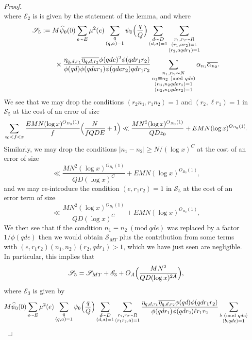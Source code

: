 \documentclass[10pt]{amsart}
\theoremstyle{plain}
\numberwithin{equation}{section}
\newcommand{\Mod}[1]{\ (\mathrm{mod}\ #1)}
\renewcommand{\hat}[1]{\widehat #1}
\begin{document}
\begin{proof}
\begin{equation}
\end{equation}
where $\mathscr{E}_2$ is is given by the statement of the lemma, and where
\begin{align*}
\mathscr{S}_5&:=M\hat{\psi}_0(0)\sum_{e\sim E}\mu^2(e)\sum_{\substack{q\\ (q,a)=1}}\psi_0\Bigl(\frac{q}{Q}\Bigr)\sum_{\substack{d\sim D\\ (d,a)=1}}\sum_{\substack{r_1,r_2\sim R\\ (r_1,a r_2)=1\\ (r_2,a q d r_1)=1}}\\
&\qquad\times\frac{\eta_{q,d,r_1}\overline{\eta_{q,d,r_2}} \phi(q d e)^2\phi(q d r_1 r_2)}{\phi(q d)\phi(q d e r_1)\phi(q d e r_2)q d r_1 r_2}\sum_{\substack{n_1,n_2\sim N\\ n_1\equiv n_2\Mod{q d e}\\ (n_1,n_2 q d e r_1)=1\\(n_2,n_1 q d e r_2)=1}}\alpha_{n_1}\overline{\alpha_{n_2}}.
\end{align*}
We see that we may drop the conditions $(r_2 n_1,r_1 n_2)=1$ and $(r_2,\ell r_1)=1$ in $\mathscr{S}_5$ at the cost of an error of size
\[
\sum_{z_0<f<x}\frac{EMN(\log{x})^{O_{B_0}(1)}}{f} \Bigl(\frac{N}{f Q D E}+1\Bigr)\ll  \frac{MN^2(\log{x})^{O_{B_0}(1)}}{Q D z_0}+E MN(\log{x})^{O_{B_0}(1)}.
\]
Similarly, we may drop the conditions $|n_1-n_2|\ge N/(\log{x})^C$ at the cost of an error of size 
\[
\ll \frac{MN^2(\log{x})^{O_{B_0}(1)}}{Q D(\log{x})^{C}}+E M N(\log{x})^{O_{B_0}(1)},
\]
and we may re-introduce the condition $(e,r_1 r_2)=1$ in $\mathscr{S}_5$ at the cost of an error term of size
\[
\ll \frac{MN^2(\log{x})^{O_{B_0}(1)}}{Q D(\log{x})^{C}}+E M N(\log{x})^{O_{B_0}(1)},
\]
 We then see that if the condition $n_1\equiv n_2\Mod{q d e}$ was replaced by a factor $1/\phi(q d e)$ then we would obtain $\mathscr{S}_{MT}$ plus the contribution from some terms with $(e,r_1r_2)(n_1,n_2)(r_2,q d r_1)>1$, which we have just seen are negligible. In particular, this implies that
\begin{equation}
\mathscr{S}_5=\mathscr{S}_{MT}+\mathscr{E}_3+O_A\Bigl(\frac{MN^2}{Q D (\log{x})^{2A}}\Bigr),\label{eq:S4Estimate}
\end{equation}
where $\mathscr{E}_3$ is given by
\begin{align*}
&M\hat{\psi}_0(0)\sum_{e\sim E}\mu^2(e)\sum_{\substack{q\\ (q,a)=1}}\psi_0\Bigl(\frac{q}{Q}\Bigr)\sum_{\substack{d\sim D\\ (d,a)=1}}\sum_{\substack{r_1,r_2\sim R\\ (r_1r_2,a)=1}}\frac{\eta_{q,d,r_1}\overline{\eta_{q,d,r_2}} \phi(q d)\phi(q d r_1 r_2)}{\phi(q d r_1)\phi(q d r_2)\ell r_1 r_2}\sum_{\substack{b\Mod{q d e}\\ (b,q d e)=1}}\\

\end{align*}
\end{proof}
\end{document}
